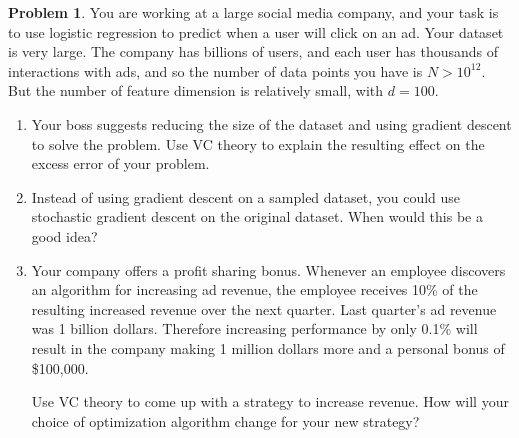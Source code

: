 \documentclass[10pt]{exam}
\theoremstyle{definition}
\newtheorem{problem}{Problem}
\begin{document}
\newpage
\begin{problem}
    You are working at a large social media company,
    and your task is to use logistic regression to predict when a user will click on an ad.
    Your dataset is very large.
    The company has billions of users, and each user has thousands of interactions with ads, and so the number of data points you have is $N>10^{12}$.
    But the number of feature dimension is relatively small, with $d=100$.

    \begin{enumerate}
        \item
            Your boss suggests reducing the size of the dataset and using gradient descent to solve the problem.
            Use VC theory to explain the resulting effect on the excess error of your problem.

        \vspace{4in}
        \item
            Instead of using gradient descent on a sampled dataset, you could use stochastic gradient descent on the original dataset.
            When would this be a good idea?

        \vspace{4in}
        \item
            Your company offers a profit sharing bonus.
            Whenever an employee discovers an algorithm for increasing ad revenue,
            the employee receives 10\% of the resulting increased revenue over the next quarter.
            Last quarter's ad revenue was 1 billion dollars.
            Therefore increasing performance by only 0.1\% will result in the company making 1 million dollars more and a personal bonus of \$100,000.

            Use VC theory to come up with a strategy to increase revenue.
            How will your choice of optimization algorithm change for your new strategy?
    \end{enumerate}
\end{problem}

\end{document}

